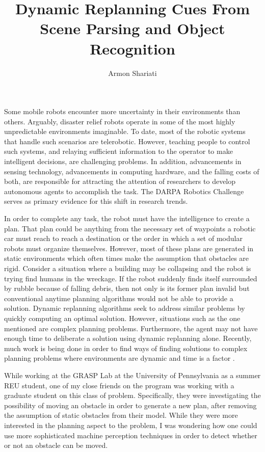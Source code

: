 \documentclass[10pt]{article}
\begin{document}
\author{Armon Shariati}
\title{Dynamic Replanning Cues From Scene Parsing and Object Recognition}
\date{}
\maketitle

Some mobile robots encounter more uncertainty in their environments than
others.  Arguably, disaster relief robots operate in some of the most highly
unpredictable environments imaginable. To date, most of the robotic systems
that handle such scenarios are telerobotic. However, teaching people to control
such systems, and relaying sufficient information to the operator to make
intelligent decisions, are challenging problems. In addition, advancements in
sensing technology, advancements in computing hardware, and the falling costs
of both, are responsible for attracting the attention of researchers to develop
autonomous agents to accomplish the task. The DARPA Robotics Challenge serves
as primary evidence for this shift in research trends.

In order to complete any task, the robot must have the intelligence to create a
plan. That plan could be anything from the necessary set of waypoints a robotic
car must reach to reach a destination or the order in which a set of modular
robots must organize themselves. However, most of these plans are generated in
static environments which often times make the assumption that obstacles are
rigid. Consider a situation where a building may be collapsing and the robot is
trying find humans in the wreckage. If the robot suddenly finds itself
surrounded by rubble because of falling debris, then not only is its former
plan invalid but conventional anytime planning algorithms would not be able to
provide a solution. Dynamic replanning algorithms seek to address similar
problems by quickly computing an optimal solution. However, situations such as
the one mentioned are complex planning problems. Furthermore, the agent may not
have enough time to deliberate a solution using dynamic replanning alone.
Recently, much work is being done in order to find ways of finding solutions to
complex planning problems where environments are dynamic and time is a factor
\cite{likhachev}.

While working at the GRASP Lab at the University of Pennsylvania as a summer
REU student, one of my close friends on the program was working with a graduate
student on this class of problem. Specifically, they were investigating the
possibility of moving an obstacle in order to generate a new plan, after
removing the assumption of static obstacles from their model. While they were
more interested in the planning aspect to the problem, I was wondering how one
could use more sophisticated machine perception techniques in order to detect
whether or not an obstacle can be moved.
\end{document}
